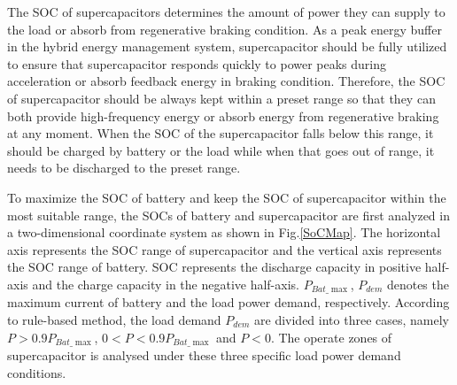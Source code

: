 \documentclass[energies,article,submit,moreauthors,pdftex,10pt,a4paper]{Definitions/mdpi}
\begin{document}
The SOC of supercapacitors determines the amount of power they can supply to the load or absorb from regenerative braking condition.
As a peak energy buffer in the hybrid energy management system, supercapacitor should be fully utilized to ensure that supercapacitor responds quickly to power peaks during acceleration or absorb feedback energy in braking condition.
Therefore, the SOC of supercapacitor should be always kept within a preset range  so that they can both provide high-frequency energy or absorb energy from regenerative braking at any moment.  When the SOC of the supercapacitor falls below this range, it should be charged by battery or the load while when that goes out of range, it needs to be discharged to the preset range.
%

To maximize the SOC of battery and keep the SOC of  supercapacitor within the most suitable range, the SOCs of battery and supercapacitor are first analyzed in a two-dimensional coordinate system as shown in Fig.\ref{SoCMap}. The horizontal axis represents the SOC range of supercapacitor and the vertical axis represents the SOC range of battery.
SOC represents the discharge capacity in positive half-axis and the charge capacity in the negative half-axis.
$P_{Bat\_\max }$, $P_{dem}$ denotes the maximum current of battery and the load power demand, respectively.
According to rule-based method, the load demand $P_{dem}$ are divided into three cases, namely ${P>0.9P_{Bat\_\max }}$, ${0<P<0.9P_{Bat\_\max }}$ and ${P<0}$.
The operate zones of supercapacitor is analysed under these three specific load power demand conditions.
\end{document}
